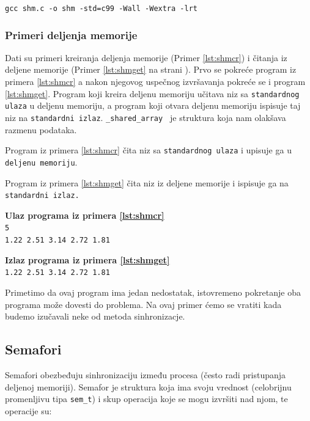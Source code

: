\documentclass[a4paper, 11pt, twoside]{article}
\newcommand{\scode}[3] {
	\hspace{.06\textwidth} 
	\begin{minipage}[t]{.88\textwidth} %
		\begin{mdframed}[topline=true,bottomline=true,leftline=true,rightline=true,backgroundcolor=gray!22, linecolor=gray!60!black,roundcorner=1mm]
			 

	\begin{center}
		\caption{\textbf{Primer \ref{lst:#3}:} #2}
	\end{center}
	\end{mdframed}
	\end{minipage}

}
\newcommand{\stdio}[4] {
	\hspace{.06\textwidth} 
	\begin{minipage}[t]{.88\textwidth} %
		\begin{mdframed}[backgroundcolor=black!7,topline=true,bottomline=true,leftline=true,rightline=true,roundcorner=1mm]
		\begin{minipage}[t]{.5\textwidth} %
			\textbf{#1} \\
				\texttt{#3}
		\end{minipage}
		\begin{minipage}[t]{.5\textwidth} %
			\textbf{#2} \\
				\texttt{#4}
		\end{minipage}
		\end{mdframed}
	\end{minipage}
	\vspace{3mm} 
}
\begin{document}
 \begin{center}
	\texttt{gcc shm.c -o shm -std=c99 -Wall -Wextra -lrt} 
\end{center}
\newpage
\subsubsection{Primeri deljenja memorije}

Dati su primeri kreiranja deljenja memorije (Primer \ref{lst:shmcr}) i čitanja iz deljene memorije (Primer \ref{lst:shmget} na strani \pageref{lst:shmget}). Prvo se pokreće program iz primera \ref{lst:shmcr} a nakon njegovog uspečnog izvršavanja pokreće se i program \ref{lst:shmget}. Program koji kreira deljenu memoriju učitava niz sa \texttt{standardnog ulaza} u deljenu memoriju, a program koji otvara deljenu memoriju ispisuje taj niz na \texttt{standardni izlaz}. \texttt{\_shared\_array } je struktura koja nam olakšava razmenu podataka.
\vspace{2mm} 

\scode{shmcreate.c}{Kreiranje deljene memorije}{shmcr}

\vspace{5mm} 
Program iz primera \ref{lst:shmcr} čita niz sa \texttt{standardnog ulaza} i upisuje ga u \texttt{deljenu memoriju}.

\newpage
Program iz primera \ref{lst:shmget} čita niz iz deljene memorije i ispisuje ga na \texttt{standardni izlaz.} 
\vspace{1mm} 

\scode{shmget.c}{Otvaranje deljene memorije}{shmget}
\stdio{Ulaz programa iz primera \ref{lst:shmcr}}{Izlaz programa iz primera \ref{lst:shmget}}{5\\ 1.22 2.51 3.14 2.72 1.81}{1.22 2.51 3.14 2.72 1.81}

\vspace{2mm} 
Primetimo da ovaj program ima jedan nedostatak, istovremeno pokretanje oba programa može dovesti do problema. Na ovaj primer ćemo se vratiti kada budemo izučavali neke od metoda sinhronizacje.

\newpage
\subsection{Semafori}

Semafori obezbeđuju sinhronizaciju između procesa (često radi pristupanja deljenoj memoriji). Semafor je struktura koja ima svoju vrednost (celobrijnu promenljivu tipa \texttt{sem\_t}) i skup operacija koje se mogu izvršiti nad njom, te operacije su: 
\vspace{-2mm} 
\end{document}
